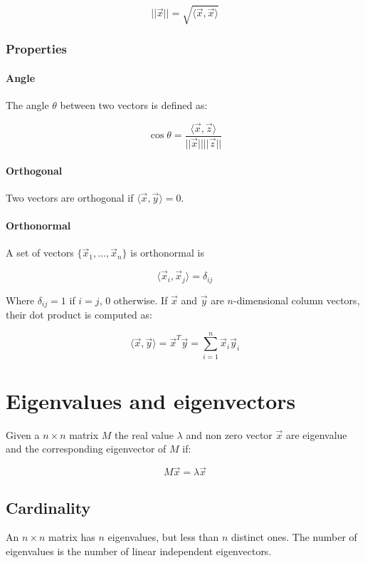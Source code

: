 		$$||\vec{x}|| = \sqrt{\langle \vec{x}, \vec{x}\rangle}$$

		\subsubsection{Properties}

			\paragraph{Angle}
			The angle $\theta$ between two vectors is defined as:

			$$\cos\theta = \frac{\langle \vec{x}, \vec{z}\rangle}{||\vec{x}||||\vec{z}||}$$

			\paragraph{Orthogonal}
			Two vectors are orthogonal if $\langle \vec{x}, \vec{y}\rangle = 0$.

			\paragraph{Orthonormal}
			A set of vectors $\{\vec{x}_1, \dots, \vec{x}_n\}$ is orthonormal is

			$$\langle \vec{x}_i, \vec{x}_j\rangle = \delta_{ij}$$

			Where $\delta_{ij} = 1$ if $i = j$, $0$ otherwise.
			If $\vec{x}$ and $\vec{y}$ are $n$-dimensional column vectors, their dot product is computed as:

			$$\langle \vec{x}, \vec{y}\rangle = \vec{x}^T\vec{y} = \sum\limits_{i=1}^n\vec{x}_i\vec{y}_i$$

\section{Eigenvalues and eigenvectors}
Given a $n\times n$ matrix $M$ the real value $\lambda$ and non zero vector $\vec{x}$ are eigenvalue and the corresponding eigenvector of $M$ if:

$$M\vec{x} = \lambda \vec{x}$$

	\subsection{Cardinality}
	An $n\times n$ matrix has $n$ eigenvalues, but less than $n$ distinct ones.
	The number of eigenvalues is the number of linear independent eigenvectors.


